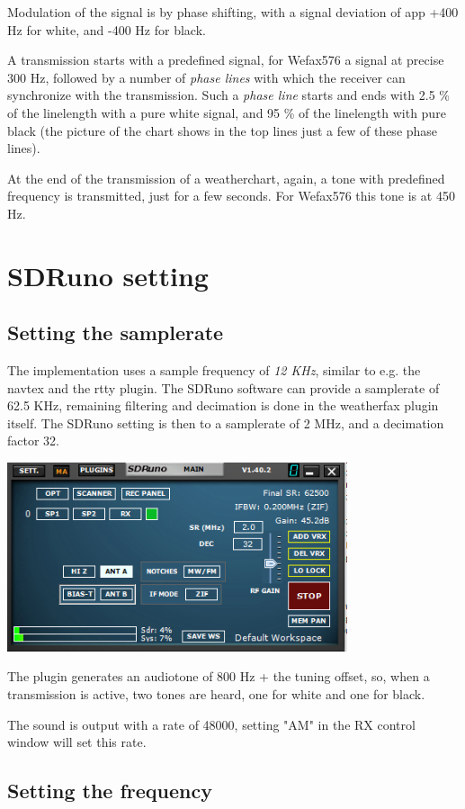 \documentclass[11pt]{article}
\begin{document}
Modulation of the signal is by phase shifting, with a signal deviation of
app  +400 Hz for white, and -400 Hz for black.

A transmission starts with a predefined signal, for Wefax576
a signal at precise 300 Hz,
followed by a number of {\em phase lines} with which the receiver can synchronize
with the transmission.
Such a {\em phase line} starts and ends with 2.5 \% of the linelength
with a pure white signal, and 95 \% of the linelength with pure black
(the picture of the chart shows in the top lines just a few of these
phase lines).

At the end of the transmission of a weatherchart, again, a tone
with predefined frequency is transmitted, just for a few seconds.
For Wefax576 this tone is at 450 Hz.

\section{SDRuno setting}
\subsection{Setting the samplerate}
The implementation uses a sample frequency of {\em 12 KHz},
similar to e.g. the navtex and the rtty plugin.
The SDRuno software can provide a samplerate
of 62.5 KHz, remaining filtering and decimation is done in
the weatherfax plugin itself.
The SDRuno setting is then to a samplerate of 2 MHz, and a decimation factor
32.

\includegraphics[width=100mm]{main-widget.png}

The plugin generates an audiotone of 800 Hz + the tuning offset,
so, when a transmission is active, two tones are heard, one for
white and one for black.

The sound is output with a rate of 48000, setting "AM" in the RX control window
will set this rate.

\subsection{Setting the frequency}
\end{document}
